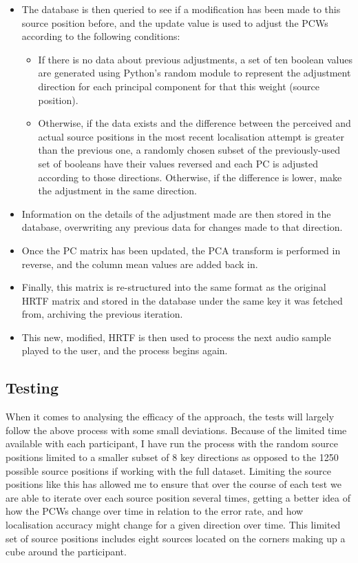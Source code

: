 \begin{itemize}
\item The database is then queried to see if a modification has been made to this source position before, and the update value is used to adjust the PCWs according to the following conditions:
\begin{itemize}
\item If there is no data about previous adjustments, a set of ten boolean values are generated using Python's random module to represent the adjustment direction for each principal component for that this weight (source position). 
\item Otherwise, if the data exists and the difference between the perceived and actual source positions in the most recent localisation attempt is greater than the previous one, a randomly chosen subset of the previously-used set of booleans have their values reversed and each PC is adjusted according to those directions. Otherwise, if the difference is lower, make the adjustment in the same direction. 
\end{itemize}
\item Information on the details of the adjustment made are then stored in the database, overwriting any previous data for changes made to that direction.
\item Once the PC matrix has been updated, the PCA transform is performed in reverse, and the column mean values are added back in.
\item Finally, this matrix is re-structured into the same format as the original HRTF matrix and stored in the database under the same key it was fetched from, archiving the previous iteration. 
\item This new, modified, HRTF is then used to process the next audio sample played to the user, and the process begins again. 
\end{itemize}

\subsection{Testing}
When it comes to analysing the efficacy of the approach, the tests will largely follow the above process with some small deviations. Because of the limited time available with each participant, I have run the process with the random source positions limited to a smaller subset of 8 key directions as opposed to the 1250 possible source positions if working with the full dataset. Limiting the source positions like this has allowed me to ensure that over the course of each test we are able to iterate over each source position several times, getting a better idea of how the PCWs change over time in relation to the error rate, and how localisation accuracy might change for a given direction over time. This limited set of source positions includes eight sources located on the corners making up a cube around the participant.


